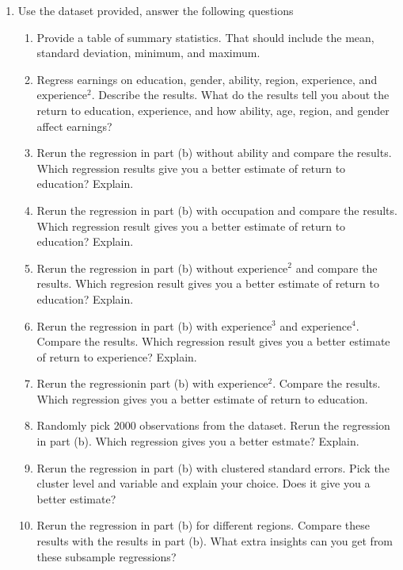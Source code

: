 \documentclass[11pt]{SelfArxOneColBMN}
\affiliation{\textsuperscript{1}\textit{John E. Walker Department of Economics,
Clemson University,Clemson, SC: email ijdavis@g.clemson.edu}}
\date{\small{Version ~\today}}
\begin{document}
\flushbottom

\maketitle

\begin{enumerate}
  \item Use the dataset provided, answer the following questions
  \begin{enumerate}[label=(\alph*)]
    \item Provide a table of summary statistics. That should include the mean, standard deviation, minimum, and maximum.
    \item Regress earnings on education, gender, ability, region, experience, and $\text{experience}^2$. Describe the results. What do the results tell you about the return to education, experience, and how ability, age, region, and gender affect earnings?
    \item Rerun the regression in part (b) without ability and compare the results. Which regression results give you a better estimate of return to education? Explain.
    \item Rerun the regression in part (b) with occupation and compare the results. Which regression result gives you a better estimate of return to education? Explain.
    \item Rerun the regression in part (b) without $\text{experience}^2$ and compare the results. Which regresion result gives you a better estimate of return to education? Explain.
    \item Rerun the regression in part (b) with $\text{experience}^3$ and $\text{experience}^4$. Compare the results. Which regression result gives you a better estimate of return to experience? Explain.
    \item Rerun the regressionin part (b) with $\text{experience}^2$. Compare the results. Which regression gives you a better estimate of return to education.
    \item Randomly pick 2000 observations from the dataset. Rerun the regression in part (b). Which regression gives you a better estmate? Explain.
    \item Rerun the regression in part (b) with clustered standard errors. Pick the cluster level and variable and explain your choice. Does it give you a better estimate?
    \item Rerun the regression in part (b) for different regions. Compare these results with the results in part (b). What extra insights can you get from these subsample regressions?

\end{enumerate}
\end{enumerate}
\end{document}

